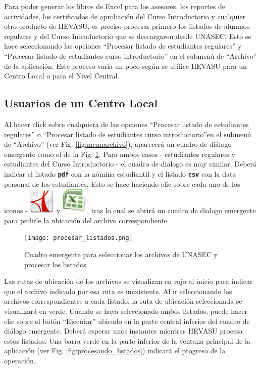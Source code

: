 \documentclass[letterpaper,12pt]{book}
\newcommand{\fileformat}[1]{\textbf{\texttt{#1}}}
\begin{document}
Para poder generar los libros de Excel para los asesores, los reportes de actividades, los certificados de aprobación del Curso Introductorio y cualquier otro producto de HEVASU, es preciso procesar primero los listados de alumnos regulares y del Curso Introductorio que se descargaron desde UNASEC. Esto se hace seleccionando las opciones ``Procesar listado de estudiantes regulares'' y ``Procesar listado de estudiantes curso introductorio'' en el submenú de ``Archivo'' de la aplicación. Este proceso varia un poco según se utilice HEVASU para un Centro Local o para el Nivel Central.

\subsection{Usuarios de un Centro Local}

Al hacer click sobre cualquiera de las opciones ``Procesar listado de estudiantes regulares'' o ``Procesar listado de estudiantes curso introductorio''en el submenú de ``Archivo'' (ver Fig. \ref{fig:menuarchivo}), aparecerá un cuadro de diálogo emergente como el de la Fig. \ref{fig:procesarlistados}. Para ambos casos - estudiantes regulares y estudiantes del Curso Introductorio - el cuadro de dialogo es muy similar. Deberá indicar el listado \fileformat{pdf} con la nómina estudiantil y el listado \fileformat{csv} con la data personal de los estudiantes. Esto se hace haciendo clic sobre cada uno de los iconos -  \includegraphics[width=2ex]{application-pdf.png} y \includegraphics[width=2ex]{excel.png}, tras lo cual se abrirá un cuadro de dialogo emergente para pedirle la ubicación del archivo correspondiente.

\begin{figure}[!ht]
  \centering
  \texttt{[image: procesar\_listados.png]}
  \caption{Cuadro emergente para seleccionar los archivos de UNASEC y procesar los listados}
  \label{fig:procesarlistados}
\end{figure}

Las rutas de ubicación de los archivos se visualizan en rojo al inicio para indicar que el archivo indicado por esa ruta es inexistente. Al ir seleccionando los archivos correspondientes a cada listado, la ruta de ubicación seleccionada se visualizará en verde. Cuando se haya seleccionado ambos listados, puede hacer clic sobre el botón ``Ejecutar'' ubicado en la parte central inferior del cuadro de diálogo emergente. Deberá esperar unos instantes mientras HEVASU procesa estos listados. Una barra verde en la parte inferior de la ventana principal de la aplicación (ver Fig. \ref{fig:procesando_listados}) indicará el progreso de la operación.
\end{document}
